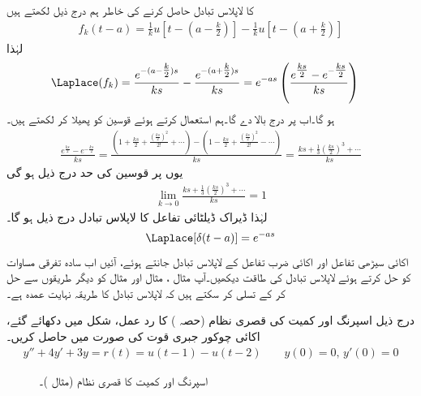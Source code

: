  کا لاپلاس تبادل حاصل کرنے کی خاطر ہم درج ذیل لکھتے ہیں
\begin{align*}
f_k(t-a)=\frac{1}{k}u[t-(a-\tfrac{k}{2})]-\frac{1}{k}u[t-(a+\tfrac{k}{2})]
\end{align*}
لہٰذا
\begin{align*}
\Laplace(f_k)&=\frac{e^{-(a-\tfrac{k}{2})s}}{ks}-\frac{e^{-(a+\tfrac{k}{2})s}}{ks}=e^{-as}\left(\frac{e^{\tfrac{ks}{2}}-e^{-\tfrac{ks}{2}}}{ks}\right)
\end{align*}
ہو گا۔اب  پر درج بالا  دے گا۔ہم  استعمال کرتے ہوئے  قوسین کو پھیلا کر لکھتے ہیں۔
\begin{align*}
\frac{e^{\tfrac{ks}{2}}-e^{-\tfrac{ks}{2}}}{ks}=\frac{(1+\tfrac{ks}{2}+\tfrac{(\tfrac{ks}{2})^2}{2!}+\cdots)-(1-\tfrac{ks}{2}+\tfrac{(\tfrac{ks}{2})^2}{2!}-\cdots)}{ks}=\frac{ks+\tfrac{1}{3}(\tfrac{ks}{2})^3+\cdots}{ks}
\end{align*}
یوں  پر قوسین کی حد درج ذیل ہو گی
\begin{align*}
\lim_{k \to 0} \frac{ks+\tfrac{1}{3}(\tfrac{ks}{2})^3+\cdots}{ks}=1
\end{align*}
لہٰذا ڈیراک ڈیلٹائی تفاعل کا لاپلاس تبادل درج ذیل ہو گا۔
\begin{align}\label{مساوات_لاپلاس_اکائی_ضرب_کا_بدل}
\Laplace[\delta(t-a)]=e^{-as}
\end{align}
اکائی سیڑھی تفاعل اور اکائی ضرب تفاعل کے لاپلاس تبادل جانتے ہوئے، آئیں اب سادہ تفرقی مساوات کو حل کرتے ہوئے لاپلاس تبادل کی طاقت دیکھیں۔آپ مثال ، مثال  اور مثال  کو دیگر طریقوں سے حل کر کے تسلی کر سکتے ہیں کہ لاپلاس تبادل کا طریقہ نہایت عمدہ ہے۔ 

درج ذیل اسپرنگ اور کمیت کی قصری نظام (حصہ ) کا رد عمل، شکل  میں دکھائے گئے، اکائی چوکور جبری قوت کی صورت میں حاصل کریں۔  
\begin{align}
y''+4y'+3y=r(t)=u(t-1)-u(t-2)\quad \quad y(0)=0,\, y'(0)=0
\end{align}
%
\begin{figure}
\centering
{}
\caption{اسپرنگ اور کمیت کا قصری نظام (مثال )۔}
\label{شکل_مثال_لاپلاس_قصری_اسپرنگ_کمیت_الف}
\end{figure}

